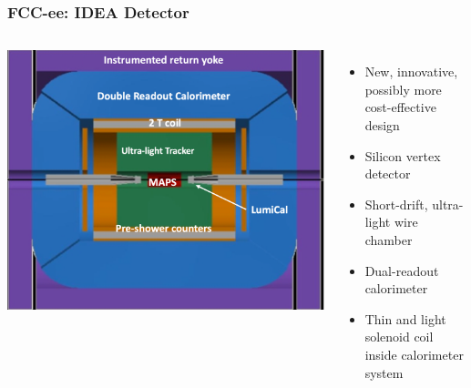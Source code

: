 \documentclass[aspectratio=169]{beamer}
\begin{document}
\begin{frame}
  \frametitle{FCC-ee: IDEA Detector}

  \begin{columns}[c]
    \includegraphics[width=\linewidth]{figures/FCC_ee_IDEA.png}%

    \begin{itemize}
      \item New, innovative, possibly more cost-effective design
      \item Silicon vertex detector
      \item Short-drift, ultra-light wire chamber
      \item Dual-readout calorimeter
      \item Thin and light solenoid coil inside calorimeter system
    \end{itemize}
  \end{columns}
\end{frame}
\end{document}
